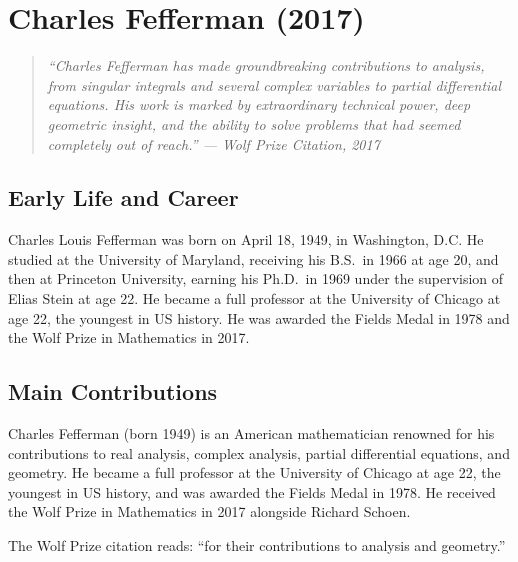 \providecommand{\BMO}{\operatorname{BMO}}
\providecommand{\Re}{\operatorname{Re}}
\providecommand{\Im}{\operatorname{Im}}
\let\C\relax
\newcommand{\C}{\mathbb{C}}

\chapter{Charles Fefferman (2017)}

\begin{quote}
\it ``Charles Fefferman has made groundbreaking contributions to analysis, from singular integrals and several complex variables to partial differential equations. His work is marked by extraordinary technical power, deep geometric insight, and the ability to solve problems that had seemed completely out of reach.'' --- Wolf Prize Citation, 2017
\end{quote}

\section{Early Life and Career}

Charles Louis Fefferman was born on April 18, 1949, in Washington, D.C. He studied at the University of Maryland, receiving his B.S.\ in 1966 at age 20, and then at Princeton University, earning his Ph.D.\ in 1969 under the supervision of Elias Stein at age 22. He became a full professor at the University of Chicago at age 22, the youngest in US history. He was awarded the Fields Medal in 1978 and the Wolf Prize in Mathematics in 2017.

\section{Main Contributions}

Charles Fefferman (born 1949) is an American mathematician renowned for his contributions to real analysis, complex analysis, partial differential equations, and geometry. He became a full professor at the University of Chicago at age 22, the youngest in US history, and was awarded the Fields Medal in 1978. He received the Wolf Prize in Mathematics in 2017 alongside Richard Schoen.

The Wolf Prize citation reads: ``for their contributions to analysis and geometry.''

